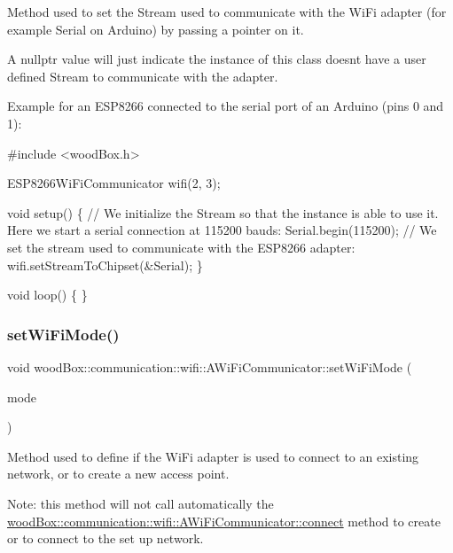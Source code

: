 Method used to set the Stream used to communicate with the Wi\+Fi adapter (for example Serial on Arduino) by passing a pointer on it.

A {\ttfamily nullptr} value will just indicate the instance of this class doesn\textquotesingle{}t have a user defined Stream to communicate with the adapter.

Example for an E\+S\+P8266 connected to the serial port of an Arduino (pins 0 and 1)\+:


\begin{DoxyCode}
\textcolor{preprocessor}{#include <woodBox.h>}

ESP8266WiFiCommunicator wifi(2, 3);

\textcolor{keywordtype}{void} setup() \{
  \textcolor{comment}{// We initialize the Stream so that the instance is able to use it. Here we start a serial connection at
       115200 bauds:}
  Serial.begin(115200);
  \textcolor{comment}{// We set the stream used to communicate with the ESP8266 adapter:}
  wifi.setStreamToChipset(&Serial);
\}

\textcolor{keywordtype}{void} loop() \{
\}
\end{DoxyCode}
 \mbox{\label{classwood_box_1_1communication_1_1wifi_1_1_a_wi_fi_communicator_a813fcffda64d86abfe0316a873f23f54}} 
\subsubsection{\texorpdfstring{set\+Wi\+Fi\+Mode()}{setWiFiMode()}}
{\footnotesize\ttfamily void wood\+Box\+::communication\+::wifi\+::\+A\+Wi\+Fi\+Communicator\+::set\+Wi\+Fi\+Mode (\begin{DoxyParamCaption}\item[{wifi\+\_\+mode}]{mode }\end{DoxyParamCaption})}

Method used to define if the Wi\+Fi adapter is used to connect to an existing network, or to create a new access point.

Note\+: this method will not call automatically the \mbox{\hyperlink{classwood_box_1_1communication_1_1wifi_1_1_a_wi_fi_communicator_a7c4763c1594a4b934e5a39e90b271799}{wood\+Box\+::communication\+::wifi\+::\+A\+Wi\+Fi\+Communicator\+::connect}} method to create or to connect to the set up network.

